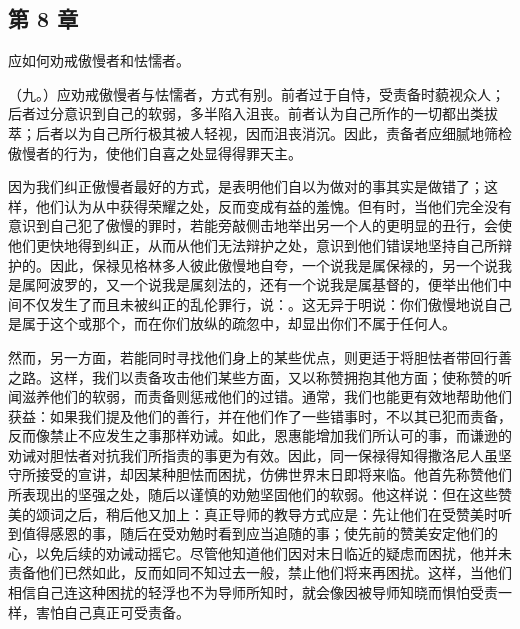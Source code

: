 
\subsection{第 8 章}

应如何劝戒傲慢者和怯懦者。\par

（九。）应劝戒傲慢者与怯懦者，方式有别。前者过于自恃，受责备时藐视众人；后者过分意识到自己的软弱，多半陷入沮丧。前者认为自己所作的一切都出类拔萃；后者以为自己所行极其被人轻视，因而沮丧消沉。因此，责备者应细腻地筛检傲慢者的行为，使他们自喜之处显得得罪天主。\par

因为我们纠正傲慢者最好的方式，是表明他们自以为做对的事其实是做错了；这样，他们认为从中获得荣耀之处，反而变成有益的羞愧。但有时，当他们完全没有意识到自己犯了傲慢的罪时，若能旁敲侧击地举出另一个人的更明显的丑行，会使他们更快地得到纠正，从而从他们无法辩护之处，意识到他们错误地坚持自己所辩护的。因此，保禄见格林多人彼此傲慢地自夸，一个说我是属保禄的，另一个说我是属阿波罗的，又一个说我是属刻法的，还有一个说我是属基督的，便举出他们中间不仅发生了而且未被纠正的乱伦罪行，说：。这无异于明说：你们傲慢地说自己是属于这个或那个，而在你们放纵的疏忽中，却显出你们不属于任何人。\par

然而，另一方面，若能同时寻找他们身上的某些优点，则更适于将胆怯者带回行善之路。这样，我们以责备攻击他们某些方面，又以称赞拥抱其他方面；使称赞的听闻滋养他们的软弱，而责备则惩戒他们的过错。通常，我们也能更有效地帮助他们获益：如果我们提及他们的善行，并在他们作了一些错事时，不以其已犯而责备，反而像禁止不应发生之事那样劝诫。如此，恩惠能增加我们所认可的事，而谦逊的劝诫对胆怯者对抗我们所指责的事更为有效。因此，同一保禄得知得撒洛尼人虽坚守所接受的宣讲，却因某种胆怯而困扰，仿佛世界末日即将来临。他首先称赞他们所表现出的坚强之处，随后以谨慎的劝勉坚固他们的软弱。他这样说：但在这些赞美的颂词之后，稍后他又加上：真正导师的教导方式应是：先让他们在受赞美时听到值得感恩的事，随后在受劝勉时看到应当追随的事；使先前的赞美安定他们的心，以免后续的劝诫动摇它。尽管他知道他们因对末日临近的疑虑而困扰，他并未责备他们已然如此，反而如同不知过去一般，禁止他们将来再困扰。这样，当他们相信自己连这种困扰的轻浮也不为导师所知时，就会像因被导师知晓而惧怕受责一样，害怕自己真正可受责备。\par

